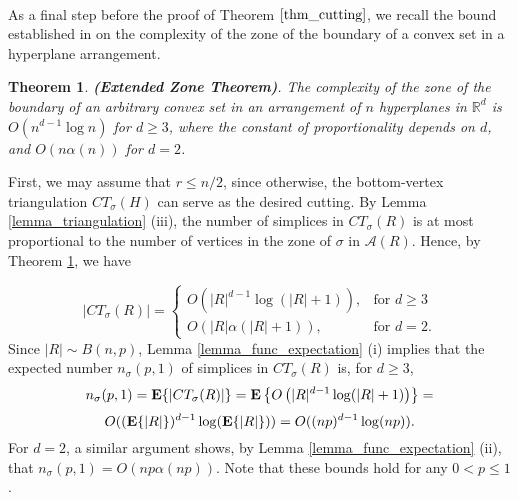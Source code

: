 \documentclass[11pt]{article}
\newtheorem{theorem}{Theorem}[section]
\def\reals{\mathbb R}
\begin{document}
\paragraph{}
As a final step before the proof of Theorem $\ref{thm_cutting}$, we recall the bound established in \cite{aps93} on the complexity of the zone of the boundary of a convex set in a hyperplane arrangement.

\begin{theorem}\label{thm_extended_zone}
\emph{{\bf(Extended Zone Theorem)}}. The complexity of the zone of the boundary of an arbitrary convex set in an arrangement of $n$ hyperplanes in $\reals^{d}$ is $O(n^{d-1}\log n)$ for $d \geq 3$, where the constant of proportionality depends on $d$, and $O(n\alpha(n))$ for $d = 2$.
\end{theorem}

 First, we may assume that $r \leq n/2$, since otherwise, the bottom-vertex triangulation $CT_{\sigma}(H)$ can serve as the desired cutting. By Lemma \ref{lemma_triangulation} (iii),  the number of simplices in $CT_{\sigma}(R)$ is at most proportional to the number of vertices in the zone of $\sigma$ in $\mathcal{A}(R)$. Hence, by Theorem \ref{thm_extended_zone}, we have


$$
|CT_{\sigma}(R)| =
\begin{cases}
    O(|R|^{d-1}\log(|R|+1)), & \mbox{for $d \geq 3$} \\
    O(|R|\alpha(|R|+1)), & \mbox{for $d=2$}.
\end{cases}
$$
Since $|R|\sim B(n,p)$, Lemma \ref{lemma_func_expectation} (i) implies that the expected number $n_{\sigma}(p,1)$ of simplices in $CT_{\sigma}(R)$ is, for $d \geq 3$,
$$
n_{\sigma}(p,1) = {\bf E}\{|CT_{\sigma}(R)|\} = {\bf E} \left\{O\left(|R|^{d-1}\log(|R|+1)\right)\right\} =
$$
\begin{equation}\label{eq_CT_R}
O(({\bf E}\{|R|\})^{d-1}\log({\bf E}\{|R|\})) = O((np)^{d-1}\log (np)).
\end{equation}
For $d = 2$, a similar argument shows, by Lemma \ref{lemma_func_expectation} (ii), that $n_{\sigma}(p,1) = O(np \alpha(np))$. Note that these bounds hold for any $0 < p \leq 1$.
\end{document}
